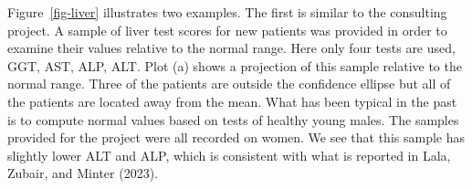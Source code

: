 \documentclass[
  12pt,
]{interact}
\begin{document}
Figure~\ref{fig-liver} illustrates two examples. The first is similar to
the consulting project. A sample of liver test scores for new patients
was provided in order to examine their values relative to the normal
range. Here only four tests are used, GGT, AST, ALP, ALT. Plot (a) shows
a projection of this sample relative to the normal range. Three of the
patients are outside the confidence ellipse but all of the patients are
located away from the mean. What has been typical in the past is to
compute normal values based on tests of healthy young males. The samples
provided for the project were all recorded on women. We see that this
sample has slightly lower ALT and ALP, which is consistent with what is
reported in Lala, Zubair, and Minter (2023).

\begin{figure}

\begin{minipage}{0.50\linewidth}



\end{minipage}%
%
\begin{minipage}{0.50\linewidth}

\end{minipage}
\end{figure}
\end{document}
